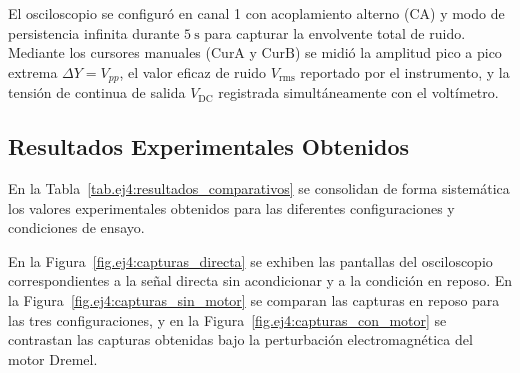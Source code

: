 El osciloscopio se configuró en canal 1 con acoplamiento alterno (CA) y modo de persistencia infinita durante
$\qty{5}{\second}$ para capturar la envolvente total de ruido. Mediante los cursores manuales ($\text{CurA}$ y
$\text{CurB}$) se midió la amplitud pico a pico extrema $\Delta Y = V_{pp}$, el valor eficaz de ruido
$V_{\text{rms}}$ reportado por el instrumento, y la tensión de continua de salida $V_{\text{DC}}$ registrada
simultáneamente con el voltímetro.

\subsection{Resultados Experimentales Obtenidos}
En la Tabla~\ref{tab.ej4:resultados_comparativos} se consolidan de forma sistemática los valores experimentales
obtenidos para las diferentes configuraciones y condiciones de ensayo.

\begin{table}[!ht]
    \centering
    \caption{Resultados cuantitativos de ruido e interferencia para las distintas configuraciones.}
    \label{tab.ej4:resultados_comparativos}
\end{table}


En la Figura~\ref{fig.ej4:capturas_directa} se exhiben las pantallas del osciloscopio correspondientes a la señal
directa sin acondicionar y a la condición en reposo. En la Figura~\ref{fig.ej4:capturas_sin_motor} se comparan las
capturas en reposo para las tres configuraciones, y en la Figura~\ref{fig.ej4:capturas_con_motor} se contrastan las
capturas obtenidas bajo la perturbación electromagnética del motor Dremel.

